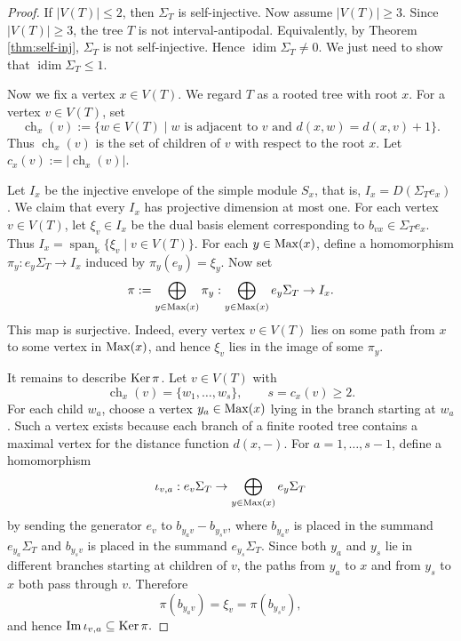 \documentclass[a4paper,leqno]{amsart}
\begin{document}
\begin{proof}
If $|V(T)|\leq 2$, then $\Sigma_T$ is self-injective. Now assume $|V(T)|\geq 3$. Since $|V(T)|\geq 3$, the tree $T$ is not interval-antipodal. Equivalently, by Theorem \ref{thm:self-inj}, $\Sigma_T$ is not self-injective. Hence
$\operatorname{idim}\Sigma_T\neq 0$. We just need to show that $\operatorname{idim}\Sigma_T\leq 1$. 

Now we fix a vertex $x\in V(T)$. We regard $T$ as a rooted tree with root $x$. For a vertex $v\in V(T)$, set
$$\operatorname{ch}_x(v):=\{w\in V(T)\mid w \text{ is adjacent to } v\text{ and } d(x,w)=d(x,v)+1\}.$$
Thus $\operatorname{ch}_x(v)$ is the set of children of $v$ with respect to the root $x$. Let $c_x(v):=|\operatorname{ch}_x(v)|$.

Let $I_x$ be the injective envelope of the simple module $S_x$, that is, $I_x=D(\Sigma_Te_x)$. We claim that every $I_x$ has projective dimension at most one.  For each vertex $v\in V(T)$, let $\xi_v\in I_x$ be the dual basis element corresponding to $b_{vx}\in \Sigma_Te_x$. Thus $I_x=\operatorname{span}_{\Bbbk}\{\xi_v\mid v\in V(T)\}$. For each $y\in \operatorname{Max}(x)$, define a homomorphism $\pi_y:e_y\Sigma_T\to I_x$ induced by $\pi_y(e_y)=\xi_y$. Now set
$$\pi:=\bigoplus_{y\in \operatorname{Max}(x)}\pi_y:\bigoplus_{y\in \operatorname{Max}(x)}e_y\Sigma_T\to I_x.$$
This map is surjective. Indeed, every vertex $v\in V(T)$ lies on some path from $x$ to some vertex in $\operatorname{Max}(x)$, and hence $\xi_v$ lies in the image of some $\pi_y$.

It remains to describe $\operatorname{Ker}\pi$. Let $v\in V(T)$ with
$$\operatorname{ch}_x(v)=\{w_1,\dots,w_s\},\qquad s=c_x(v)\geq 2.$$
For each child $w_a$, choose a vertex $y_a\in \operatorname{Max}(x)$ lying in the branch starting at $w_a$. Such a vertex exists because each branch of a finite rooted tree contains a maximal vertex for the distance function $d(x,-)$. For $a=1,\dots,s-1$, define a homomorphism
$$\iota_{v,a}:e_v\Sigma_T\to \bigoplus_{y\in \operatorname{Max}(x)}e_y\Sigma_T$$
by sending the generator $e_v$ to $b_{y_av}-b_{y_sv}$, where $b_{y_av}$ is placed in the summand $e_{y_a}\Sigma_T$ and $b_{y_sv}$ is placed in the summand $e_{y_s}\Sigma_T$. Since both $y_a$ and $y_s$ lie in different branches starting at children of $v$, the paths from $y_a$ to $x$ and from $y_s$ to $x$ both pass through $v$. Therefore
$$\pi(b_{y_av})=\xi_v=\pi(b_{y_sv}),$$
and hence $\operatorname{Im}\iota_{v,a}\subseteq \operatorname{Ker}\pi.$


\end{proof}
\end{document}
